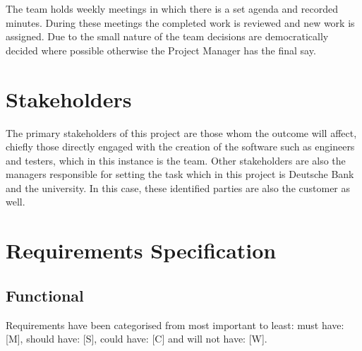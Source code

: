 \documentclass[9pt]{article} %
\begin{document}
	The team holds weekly meetings in which there is a set agenda and recorded minutes. During these meetings the completed work is reviewed and new work is assigned. Due to the small nature of the team decisions are democratically decided where possible otherwise the Project Manager has the final say. 
	
	\section{Stakeholders}
	The primary stakeholders of this project are those whom the outcome will affect, chiefly those directly engaged with the creation of the software such as engineers and testers, which in this instance is the team. Other stakeholders are also the managers responsible for setting the task which in this project is Deutsche Bank and the university. In this case, these identified parties are also the customer as well.

	\section{Requirements Specification}
	\subsection{Functional}
	Requirements have been categorised from most important to least: must have: [M], should have: [S], could have: [C] and will not have: [W].  
	
\end{document}
